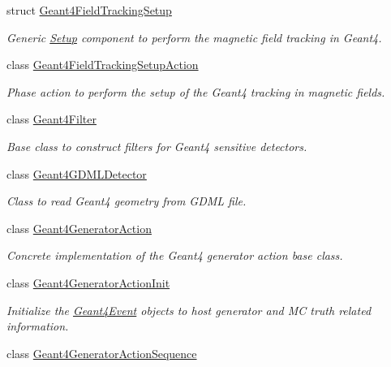 \begin{DoxyCompactItemize}
struct \hyperlink{struct_d_d4hep_1_1_simulation_1_1_geant4_field_tracking_setup}{Geant4\+Field\+Tracking\+Setup}
\begin{DoxyCompactList}\small\item\em Generic \hyperlink{namespace_d_d4hep_1_1_simulation_1_1_setup}{Setup} component to perform the magnetic field tracking in Geant4. \end{DoxyCompactList}\item 
class \hyperlink{class_d_d4hep_1_1_simulation_1_1_geant4_field_tracking_setup_action}{Geant4\+Field\+Tracking\+Setup\+Action}
\begin{DoxyCompactList}\small\item\em Phase action to perform the setup of the Geant4 tracking in magnetic fields. \end{DoxyCompactList}\item 
class \hyperlink{class_d_d4hep_1_1_simulation_1_1_geant4_filter}{Geant4\+Filter}
\begin{DoxyCompactList}\small\item\em Base class to construct filters for Geant4 sensitive detectors. \end{DoxyCompactList}\item 
class \hyperlink{class_d_d4hep_1_1_simulation_1_1_geant4_g_d_m_l_detector}{Geant4\+G\+D\+M\+L\+Detector}
\begin{DoxyCompactList}\small\item\em Class to read Geant4 geometry from G\+D\+ML file. \end{DoxyCompactList}\item 
class \hyperlink{class_d_d4hep_1_1_simulation_1_1_geant4_generator_action}{Geant4\+Generator\+Action}
\begin{DoxyCompactList}\small\item\em Concrete implementation of the Geant4 generator action base class. \end{DoxyCompactList}\item 
class \hyperlink{class_d_d4hep_1_1_simulation_1_1_geant4_generator_action_init}{Geant4\+Generator\+Action\+Init}
\begin{DoxyCompactList}\small\item\em Initialize the \hyperlink{class_d_d4hep_1_1_simulation_1_1_geant4_event}{Geant4\+Event} objects to host generator and MC truth related information. \end{DoxyCompactList}\item 
class \hyperlink{class_d_d4hep_1_1_simulation_1_1_geant4_generator_action_sequence}{Geant4\+Generator\+Action\+Sequence}

\end{DoxyCompactItemize}
